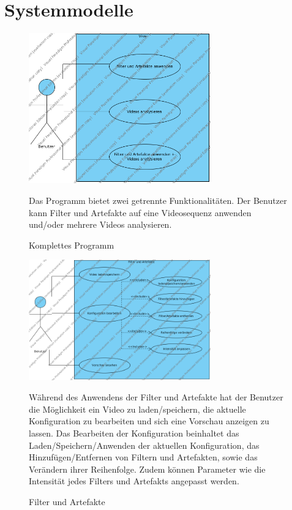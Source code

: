 \documentclass[parskip=full]{scrartcl}
\begin{document}
\section{Systemmodelle}
\begin{figure}[htbp]
{\centering 
\includegraphics[width=0.7\textwidth]{UsecaseDiagrams/Vive.png}
\caption{Komplettes Programm} }

Das Programm bietet zwei getrennte Funktionalitäten. Der Benutzer kann Filter und Artefakte auf eine Videosequenz anwenden und/oder mehrere Videos analysieren.

\end{figure}
\begin{figure}[htbp]
{\centering
\includegraphics[width=0.7\textwidth]{UsecaseDiagrams/Filter_und_Artefakte.png}
\caption{Filter und Artefakte} }

Während des Anwendens der Filter und Artefakte hat der Benutzer die Möglichkeit ein Video zu laden/speichern, die aktuelle Konfiguration zu bearbeiten und sich eine Vorschau anzeigen zu lassen. Das Bearbeiten der Konfiguration beinhaltet das Laden/Speichern/Anwenden der aktuellen Konfiguration, das Hinzufügen/Entfernen von Filtern und Artefakten, sowie das Verändern ihrer Reihenfolge. Zudem können Parameter wie die Intensität jedes Filters und Artefakts angepasst werden.

\end{figure}
\end{document}
